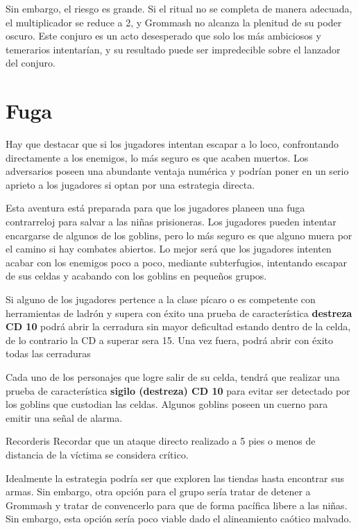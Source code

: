 \documentclass[10pt,twoside,twocolumn,openany]{dndbook}
\begin{document}
Sin embargo, el riesgo es grande. Si el ritual no se completa de manera adecuada, el multiplicador 
se reduce a 2, y Grommash no alcanza la plenitud de su poder oscuro. Este conjuro es un acto 
desesperado que solo los más ambiciosos y temerarios intentarían, y su resultado puede ser 
impredecible sobre el lanzador del conjuro.


\section{Fuga}

Hay que destacar que si los jugadores intentan escapar a lo loco, confrontando directamente a los 
enemigos, lo más seguro es que acaben muertos. Los adversarios poseen una abundante ventaja 
numérica y podrían poner en un serio aprieto a los jugadores si optan por una estrategia directa.

Esta aventura está preparada para que los jugadores planeen una fuga contrarreloj para salvar a 
las niñas prisioneras. Los jugadores pueden intentar encargarse de algunos de los goblins, pero lo 
más seguro es que alguno muera por el camino si hay combates abiertos. Lo mejor será que los 
jugadores intenten acabar con los enemigos poco a poco, mediante subterfugios, intentando escapar 
de sus celdas y acabando con los goblins en pequeños grupos.

Si alguno de los jugadores pertence a la clase pícaro o es competente con herramientas de ladrón 
y supera con éxito una prueba de característica \textbf{destreza CD 10} podrá abrir la cerradura
sin mayor deficultad estando dentro de la celda, de lo contrario la CD a superar sera 15. Una vez 
fuera, podrá abrir con éxito todas las cerraduras 

Cada uno de los personajes que logre salir de su celda, tendrá que realizar una prueba de 
característica \textbf{sigilo (destreza) CD 10} para evitar ser detectado por los goblins que 
custodian las celdas. Algunos goblins poseen un cuerno para emitir una señal de alarma. 

\begin{DndSidebar}{Recorderis}
  Recordar que un ataque directo realizado a 5 pies o menos de distancia de la víctima se 
  considera crítico.
\end{DndSidebar}

Idealmente la estrategia podría ser que exploren las tiendas hasta encontrar sus armas. Sin 
embargo, otra opción para el grupo sería tratar de detener a Grommash y tratar de convencerlo para 
que de forma pacífica libere a las niñas. Sin embargo, esta opción sería poco viable dado el 
alineamiento caótico malvado.
\end{document}
